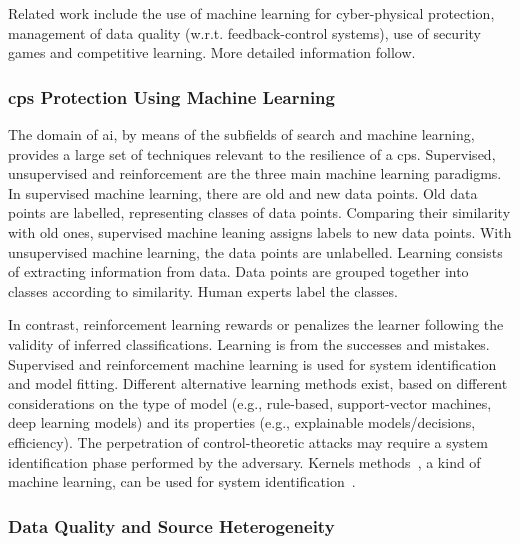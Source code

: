 \documentclass[letterpaper, 10pt, conference]{IEEEtran}
\begin{document}
Related work include the use of machine
learning for cyber-physical protection, management of
data quality (w.r.t. feedback-control systems), use of security
games and competitive learning. More detailed information
follow.

\medskip

\subsubsection{\gls*{cps} Protection Using Machine
Learning}

The domain of \gls*{ai}, by means of the
subfields of search and machine learning, provides a large set of
techniques relevant to the resilience of a \gls*{cps}.  Supervised, unsupervised and
reinforcement
are the three main machine
learning paradigms. In supervised machine learning, there are old and new
data points. Old data points are labelled, representing
classes of data points. Comparing their similarity with old
ones, supervised machine leaning assigns labels to
new data points. With unsupervised machine learning, the data points
are unlabelled. Learning  consists of extracting information from
data. Data points are grouped together into classes according to
similarity. Human experts label the classes.

In contrast, reinforcement learning rewards or penalizes the learner
following the validity of inferred classifications. Learning is  from the successes
and mistakes. Supervised and reinforcement machine learning is
used for system identification and model fitting.
Different alternative learning
methods exist, based on different considerations on the type of model
(e.g., rule-based, support-vector machines, deep learning models) and
its properties (e.g., explainable models/decisions, efficiency). The
perpetration of control-theoretic attacks
\cite{Teixeira2015,smith2015covert} may require a
system identification phase performed by the adversary. Kernels
methods~\cite{shawe2004kernel}, a kind of machine learning, can be used for system identification~\cite{PILLONETTO2014657,PILLONETTO201081}.

\subsubsection{Data Quality and Source Heterogeneity}
\end{document}
